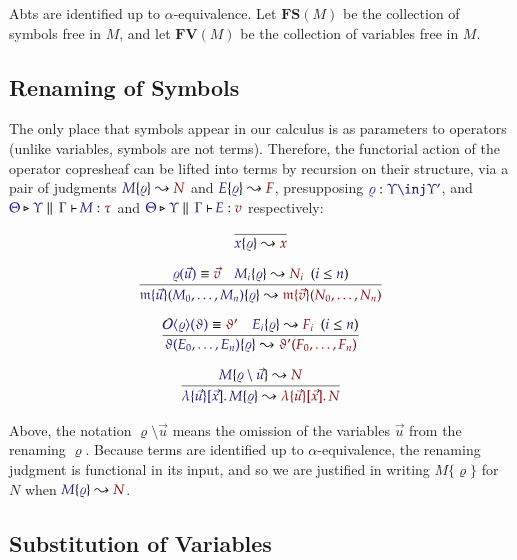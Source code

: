 \documentclass[11pt]{article}
\theoremstyle{definition}
\theoremstyle{remark}
\numberwithin{equation}{section}
\def\IModeColorName{MidnightBlue}
\def\OModeColorName{Maroon}
\newcommand\IMode[1]{{\color{\IModeColorName}{#1}}}
\newcommand\OMode[1]{{\color{\OModeColorName}{#1}}}
\newcommand\HypJ[2]{#1\ \ (#2)}
\newcommand\Of[2]{\IMode{#1}: \IMode{#2}}
\newcommand\MkBTm[3]{\mathbb{\lambda}\{#1\}[#2].\, #3}
\newcommand\Leq[2]{\IMode{#1}\leq\IMode{#2}}
\newcommand\Match[2]{\IMode{#1}\equiv\OMode{#2}}
\newcommand\Operators{\mathcal{O}}
\newcommand\FLift[2]{
  \Operators\langle#1%
  \ifthenelse{\equal{#2}{}}{}{, #2}\rangle%
}
\newcommand\IsAbt[5]{%
  \IMode{#1}\triangleright%
  \IMode{#2}\parallel%
  \,{\IMode{#3}\vdash}\,%
  \IMode{#4}:\OMode{#5}%
}
\newcommand\MV[1]{\mathfrak{#1}}
\newcommand\MApp[3]{#1\{#2\}(#3)}
\newcommand\App[2]{#1(#2)}
\newcommand\FV[1]{\mathbf{FV}\left(#1\right)}
\newcommand\FS[1]{\mathbf{FS}\left(#1\right)}
\newcommand\Rename[2]{%
  #2\{#1\}%
}
\newcommand\IsRenaming[3]{%
  \Rename{\IMode{#1}}{\IMode{#2}}%
  \leadsto\OMode{#3}%
}
\begin{document}
Abts are identified up to $\alpha$-equivalence. Let $\FS{M}$ be the collection
of symbols free in $M$, and let $\FV{M}$ be the collection of variables free in
$M$. 

\subsection{Renaming of Symbols}

The only place that symbols appear in our calculus is as parameters to operators
(unlike variables, symbols are not terms). Therefore, the functorial action of
the operator copresheaf can be lifted into terms by recursion on their
structure, via a pair of judgments $\IsRenaming{\varrho}{M}{N}$ and
$\IsRenaming{\varrho}{E}{F}$, presupposing $\Of{\varrho}{\Upsilon\inj\Upsilon'}$,
and $\IsAbt{\Theta}{\Upsilon}{\Gamma}{M}{\tau}$ and
$\IsAbt{\Theta}{\Upsilon}{\Gamma}{E}{v}$ respectively:

\begin{gather*}
  \infer{
    \IsRenaming{\varrho}{x}{x}
  }{
  }
\\[6pt]
  \infer{
    \IsRenaming{\varrho}{
      \MApp{\MV{m}}{\vec{u}}{M_0,\dots,M_n}
    }{
      \MApp{\MV{m}}{\vec{v}}{N_0,\dots,N_n}
    }
  }{
    \Match{\varrho(\vec{u})}{\vec{v}}
&
    \HypJ{
      \IsRenaming{\varrho}{M_i}{N_i}
    }{
      \Leq{i}{n}
    }
  }
\\[6pt]
  \infer{
    \IsRenaming{\varrho}{
      \App{\vartheta}{E_0,\dots,E_n}
    }{
      \App{\vartheta'}{F_0,\dots,F_n}
    }
  }{
    \Match{\FLift{\varrho}{}(\vartheta)}{\vartheta'}
&
    \HypJ{
      \IsRenaming{\varrho}{E_i}{F_i}
    }{
      \Leq{i}{n}
    }
  }
\\[6pt]
  \infer{
    \IsRenaming{\varrho}{
      \MkBTm{\vec{u}}{\vec{x}}{M}
    }{
      \MkBTm{\vec{u}}{\vec{x}}{N}
    }
  }{
    \IsRenaming{\varrho\setminus\vec{u}}{M}{N}
  }
\end{gather*}

Above, the notation $\varrho\setminus\vec{u}$ means the omission of the
variables $\vec{u}$ from the renaming $\varrho$. Because terms are identified up
to $\alpha$-equivalence, the renaming judgment is functional in its input, and
so we are justified in writing $\Rename{\varrho}{M}$ for $N$ when
$\IsRenaming{\varrho}{M}{N}$.


\subsection{Substitution of Variables}
\end{document}
